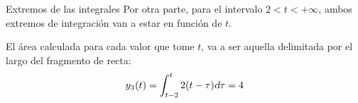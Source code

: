 \begin{mdframed}[style=ExampleFrame]
\begin{numset}
\begin{numitem}{Extremos de las integrales}
            Por otra parte, para el intervalo $2 < t < +\infty$, ambos extremos de integración van a estar en función de $t$.
            
            El área calculada para cada valor que tome $t$, va a ser aquella delimitada por el largo del fragmento de recta:
            \[
                \fx[y_3]{t}
                = \int_{t-2}^{t} 2 (t - \tau) \dif \tau
                = 4
            \]
        \end{numitem}
    \end{numset}
\end{mdframed}